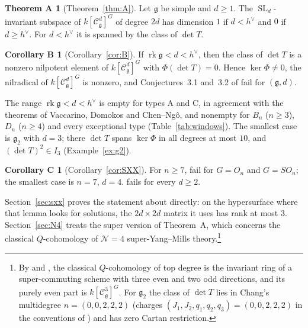 \documentclass[11pt]{article}
\theoremstyle{definition}
\newtheorem*{theoremA}{Theorem A}
\newtheorem*{corollaryB}{Corollary B}
\newtheorem*{corollaryC}{Corollary C}
\newcommand{\g}{\mathfrak g}
\newcommand{\Cs}{\mathcal C}
\newcommand{\rk}{\operatorname{rk}}
\newcommand{\hv}{h^\vee}
\DeclareMathOperator{\SL}{SL}
\begin{document}
\begin{theoremA}[Theorem~\ref{thm:A}]
Let $\g$ be simple and $d\ge1$. The $\SL_d$-invariant subspace of $k[\Cs^d_\g]^G$ of degree $2d$ has dimension $1$ if $d<\hv$ and $0$ if $d\ge\hv$. For $d<\hv$ it is spanned by the class of $\det T$.
\end{theoremA}

\begin{corollaryB}[Corollary~\ref{cor:B}]
If $\rk\g<d<\hv$, then the class of $\det T$ is a nonzero nilpotent element of $k[\Cs^d_\g]^G$ with $\Phi(\det T)=0$. Hence $\ker\Phi\neq0$, the nilradical of $k[\Cs^d_\g]^G$ is nonzero, and Conjectures~3.1 and~3.2 of \cite{CN20} fail for $(\g,d)$.
\end{corollaryB}

The range $\rk\g<d<\hv$ is empty for types A and C, in agreement with the theorems of Vaccarino, Domokos and Chen--Ng\^o, and nonempty for $B_n$ ($n\ge3$), $D_n$ ($n\ge4$) and every exceptional type (Table~\ref{tab:windows}). The smallest case is $\g_2$ with $d=3$; there $\det T$ spans $\ker\Phi$ in all degrees at most $10$, and $(\det T)^2\in I_3$ (Example~\ref{ex:g2}).

\begin{corollaryC}[Corollary~\ref{cor:SXX}]
For $n\ge7$, \cite[Thm.~1.2(1), Cor.~1.3]{SXX23} fail for $G=O_n$ and $G=SO_n$; the smallest case is $n=7$, $d=4$. \cite[Lemma~5.2]{SXX23} fails for every $d\ge2$.
\end{corollaryC}

Section~\ref{sec:sxx} proves the statement about \cite[Lemma~5.2]{SXX23} directly: on the hypersurface where that lemma looks for solutions, the $2d\times2d$ matrix it uses has rank at most $3$. Section~\ref{sec:N4} treats the super version of Theorem~A, which concerns the classical $Q$-cohomology of $\mathcal N=4$ super-Yang--Mills theory.\footnote{By \cite{CY13} and \cite[Prop.~4]{Ch26}, the classical $Q$-cohomology of top degree is the invariant ring of a super-commuting scheme with three even and two odd directions, and its purely even part is $k[\Cs^3_\g]^G$. For $\g_2$ the class of $\det T$ lies in Chang's multidegree $n=(0,0,2,2,2)$ (charges $(J_1,J_2,q_1,q_2,q_3)=(0,0,2,2,2)$ in the conventions of \cite[\S5.2]{Ch26}) and has zero Cartan restriction.}
\end{document}
